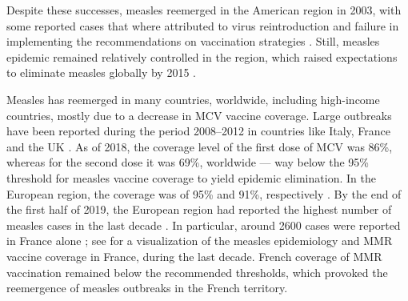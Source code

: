 Despite these successes, measles reemerged in the American region in 2003, with some reported cases that where attributed to virus reintroduction and failure in implementing the recommendations on vaccination strategies \cite[]{MMWR_MeaslesErradication1997,DeQuadros2004,Andrus2011}. Still, measles epidemic remained relatively controlled in the region, which raised expectations to eliminate measles globally by 2015 \cite[]{DeQuadros2004}. 

Measles has reemerged in many countries, worldwide, including high-income countries, mostly due to a decrease in MCV vaccine coverage. Large outbreaks have been reported during the period 2008--2012 in countries like Italy, France and the UK \cite[]{Amendola2015,Antona2013,Keenan2017,Bechini2019}. As of 2018, the coverage level of the first dose of MCV was 86\%, whereas for the second dose it was 69\%, worldwide \cite[]{Peck2018} --- way below the 95\% threshold for measles vaccine coverage to yield epidemic elimination. In the European region, the coverage was of 95\% and 91\%, respectively \cite[]{Peck2018}. By the end of the first half of 2019, the European region had reported the highest number of measles cases in the last decade \cite[]{WHO_MeaslesEUR2018,ECDC_MR2019}. In particular, around 2600 cases were reported in France alone \cite[]{WHO_MeaslesFrance2020}; see  for a visualization of the measles epidemiology and MMR vaccine coverage in France, during the last decade. French coverage of MMR vaccination remained below the recommended thresholds, which provoked the reemergence of measles outbreaks in the French territory.



